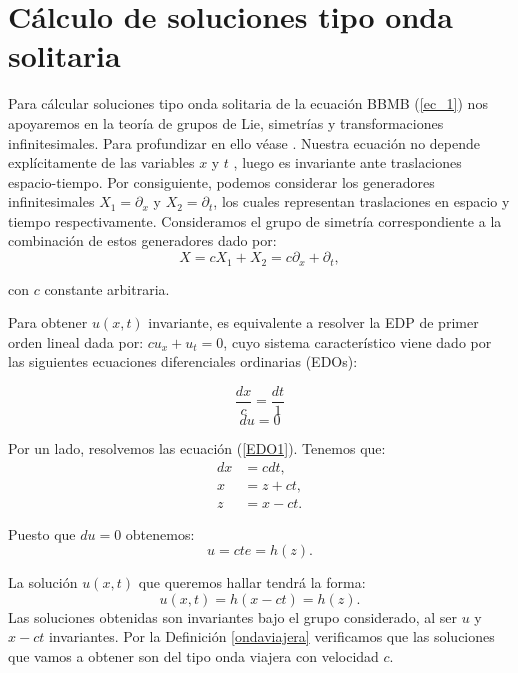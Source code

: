 \section{Cálculo de soluciones tipo onda solitaria}

Para cálcular soluciones tipo onda solitaria de la ecuación BBMB (\ref{ec_1}) nos apoyaremos en la teoría de grupos de Lie, simetrías y transformaciones infinitesimales. Para profundizar en ello véase \cite{simetria7,simetria8}.
Nuestra ecuación no depende explícitamente de las variables $x$ y $t$ , luego es invariante ante traslaciones espacio-tiempo. Por consiguiente, podemos considerar los generadores infinitesimales $X_{1}=\partial_{x}$  y $X_{2}=\partial_{t}$, los cuales representan traslaciones en espacio y tiempo respectivamente. Consideramos el grupo de simetría correspondiente a la combinación de estos generadores dado por:
 \begin{equation}
     X=cX_{1}+X_{2}=c\partial_{x}+\partial_{t},
 \end{equation}

\noindent con $c$ constante arbitraria.
 
Para obtener $u(x,t)$ invariante, es equivalente a resolver la EDP de primer orden lineal dada por: $cu_{x}+u_{t}=0$, cuyo sistema característico viene dado por las siguientes ecuaciones diferenciales ordinarias (EDOs):

\begin{equation}
    \frac{dx}{c}=\frac{dt}{1}
\end{equation}\label{EDO1}
\begin{equation}
   du=0
\end{equation}\label{EDO10}

Por un lado, resolvemos las ecuación (\ref{EDO1}). Tenemos que:
\begin{align*}
    dx &= cdt,\\
    x &= z+ct,\\
    z &= x-ct.
\end{align*}

 Puesto que $du=0$ obtenemos:
    $$u=cte=h(z).$$

La solución $u(x,t)$ que queremos hallar tendrá la forma:
\begin{equation}
    u(x,t)=h(x-ct)=h(z).
\end{equation}
 Las soluciones obtenidas son invariantes bajo el grupo considerado, al ser $u$ y $x-ct$ invariantes. Por la Definición \ref{ondaviajera} verificamos que las soluciones que vamos a obtener son del tipo onda viajera con velocidad $c$.\\

